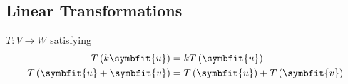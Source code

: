 \documentclass{article}
\begin{document}
\begin{multicols*}{3}
    \subsection{Linear Transformations}
    \(T:V \to W\) satisfying
    \begin{align*}
        T\left( k\symbfit{u} \right) & = k T\left( \symbfit{u} \right) \\
        T\left( \symbfit{u} + \symbfit{v} \right) & = T\left( \symbfit{u} \right) + T\left( \symbfit{v} \right)
    \end{align*}

\end{multicols*}
\end{document}

